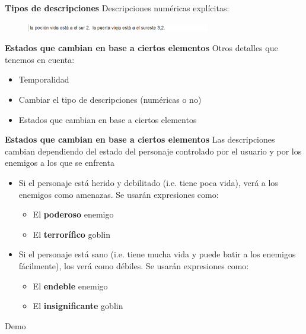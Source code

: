 \begin{tframe}{\textbf{Tipos de descripciones}}
	Descripciones numéricas explícitas:
		\begin{figure}[h]
			\includegraphics[width=8cm]{../img/descripcionnumerica.PNG}
		\end{figure}
\end{tframe}


\begin{tframe}{\textbf{Estados que cambian en base a ciertos elementos}}
	Otros detalles que tenemos en cuenta:
	\begin{itemize}
		\item Temporalidad
		\item Cambiar el tipo de descripciones (numéricas o no)
		\item<+-| alert@+> Estados que cambian en base a ciertos elementos
	\end{itemize}
\end{tframe}

\begin{frame}[c]{\textbf{Estados que cambian en base a ciertos elementos}}
	Las descripciones cambian dependiendo del estado del personaje controlado por el usuario y por los enemigos a los que se enfrenta
	\begin{itemize}
		\item Si el personaje está herido y debilitado (i.e. tiene poca vida), verá a los enemigos como amenazas. Se usarán expresiones como:
		\begin{itemize}
			\item El \textbf{poderoso} enemigo
			\item El \textbf{terrorífico} goblin
		\end{itemize}
		\item Si el personaje está sano (i.e. tiene mucha vida y puede batir a los enemigos fácilmente), los verá como débiles. Se usarán expresiones como:
		\begin{itemize}
			\item El \textbf{endeble} enemigo
			\item El \textbf{insignificante} goblin
		\end{itemize}
	\end{itemize}
\end{frame}

\begin{frame}[c]{}
	\begin{center}
		\Huge Demo
	\end{center}
\end{frame}

